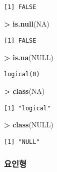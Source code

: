 \documentclass[11pt,a4paper]{book}
\newenvironment{Shaded}{\begin{snugshade}}{\end{snugshade}}
\newcommand{\KeywordTok}[1]{\textcolor[rgb]{0.13,0.29,0.53}{\textbf{#1}}}
\newcommand{\StringTok}[1]{\textcolor[rgb]{0.31,0.60,0.02}{#1}}
\newcommand{\OtherTok}[1]{\textcolor[rgb]{0.56,0.35,0.01}{#1}}
\newcommand{\OperatorTok}[1]{\textcolor[rgb]{0.81,0.36,0.00}{\textbf{#1}}}
\newcommand{\NormalTok}[1]{#1}
\theoremstyle{definition}
\theoremstyle{definition}
\theoremstyle{definition}
\theoremstyle{remark}
\begin{document}
\begin{verbatim}
[1] FALSE
\end{verbatim}

\begin{Shaded}
\begin{Highlighting}[]
\OperatorTok{>}\StringTok{ }\KeywordTok{is.null}\NormalTok{(}\OtherTok{NA}\NormalTok{)}
\end{Highlighting}
\end{Shaded}

\begin{verbatim}
[1] FALSE
\end{verbatim}

\begin{Shaded}
\begin{Highlighting}[]
\OperatorTok{>}\StringTok{ }\KeywordTok{is.na}\NormalTok{(}\OtherTok{NULL}\NormalTok{)}
\end{Highlighting}
\end{Shaded}

\begin{verbatim}
logical(0)
\end{verbatim}

\begin{Shaded}
\begin{Highlighting}[]
\OperatorTok{>}\StringTok{ }\KeywordTok{class}\NormalTok{(}\OtherTok{NA}\NormalTok{)}
\end{Highlighting}
\end{Shaded}

\begin{verbatim}
[1] "logical"
\end{verbatim}

\begin{Shaded}
\begin{Highlighting}[]
\OperatorTok{>}\StringTok{ }\KeywordTok{class}\NormalTok{(}\OtherTok{NULL}\NormalTok{)}
\end{Highlighting}
\end{Shaded}

\begin{verbatim}
[1] "NULL"
\end{verbatim}

\normalsize

\subsubsection{요인형}
\end{document}
